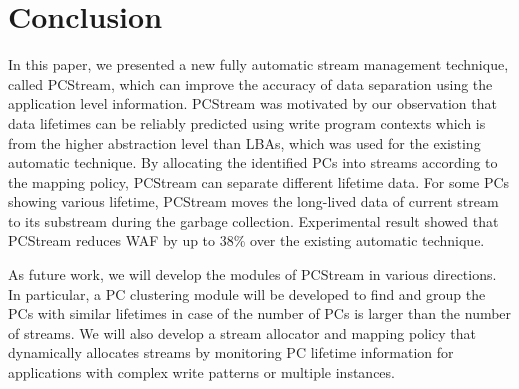 \section{Conclusion}
In this paper, we presented a new fully automatic stream management technique,
called {\sf PCStream}, which can improve the accuracy of data separation
using the application level information.
{\sf PCStream} was motivated by our observation that data lifetimes can be
reliably predicted using write program contexts which is from the higher
abstraction level than LBAs, which was used for the existing automatic technique.
By allocating the identified PCs into streams according to the mapping policy,
{\sf PCStream} can separate different lifetime data. 
For some PCs showing various lifetime, {\sf PCStream} moves the long-lived data of 
current stream to its substream during the garbage collection.
Experimental result showed that {\sf PCStream} reduces WAF by up to 38\% over the existing
automatic technique.

As future work, we will develop the modules of {\sf PCStream} in various directions. 
In particular, a PC clustering module will be developed to find and group the PCs with similar lifetimes
in case of the number of PCs is larger than the number of streams.
We will also develop a stream allocator and mapping policy that dynamically allocates 
streams by monitoring PC lifetime information for 
applications with complex write patterns or multiple instances.
